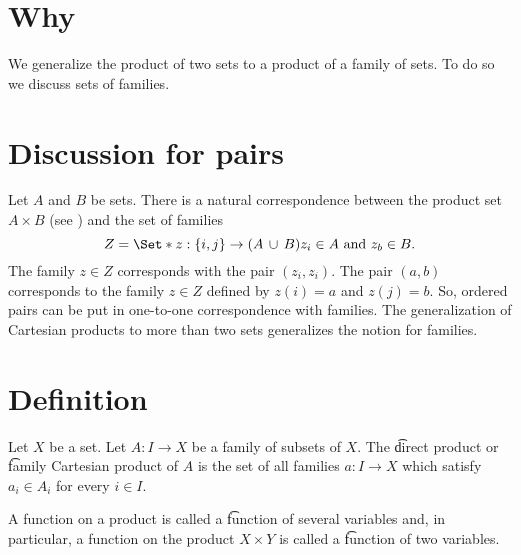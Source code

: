 

\section*{Why}

We generalize the product of two sets to a product of a family of sets.
To do so we discuss sets of families.

\section*{Discussion for pairs}

Let $A$ and $B$ be sets.
There is a natural correspondence between the product set $A \times B$ (see ) and the set of families
    \[
Z = \Set*{z: \set{i, j} \to (A \union B)}{z_i \in A \text{ and } z_b \in B}.
    \]
The family $z \in Z$ corresponds with the pair $(z_i, z_i)$.
The pair $(a, b)$ corresponds to the family $z \in Z$ defined by $z(i) = a$ and $z(j) = b$.
So, ordered pairs can be put in one-to-one correspondence with families.
The generalization of Cartesian products to more than two sets generalizes the notion for families.

\section*{Definition}

Let $X$ be a set.
Let $A: I \to X$ be a family of subsets of $X$.
The \t{direct product} or \t{family Cartesian product} of $A$ is the set of all families $a: I \to X$ which satisfy $a_i \in A_i$ for every $i \in I$.

A function on a product is called a \t{function of several variables} and, in particular, a function on the product $X \times Y$ is called a \t{function of two variables.}


